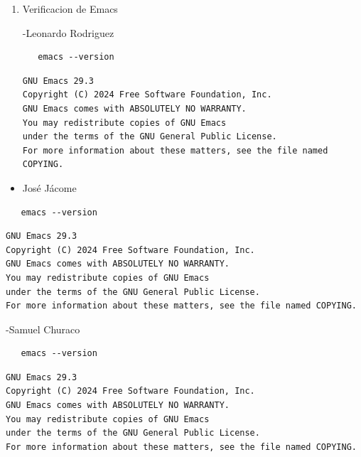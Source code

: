 \documentclass{article}
\begin{document}
\begin{enumerate}
-Samuel Churaco
\begin{verbatim}
   python --version
\end{verbatim}

\begin{verbatim}
Python 3.11.15
\end{verbatim}

\item Verificacion de Emacs

-Leonardo Rodriguez
\begin{verbatim}
   emacs --version
\end{verbatim}

\begin{verbatim}
GNU Emacs 29.3
Copyright (C) 2024 Free Software Foundation, Inc.
GNU Emacs comes with ABSOLUTELY NO WARRANTY.
You may redistribute copies of GNU Emacs
under the terms of the GNU General Public License.
For more information about these matters, see the file named COPYING.
\end{verbatim}
\end{enumerate}


\begin{itemize}
\item José Jácome
\end{itemize}
\begin{verbatim}
   emacs --version
\end{verbatim}

\begin{verbatim}
GNU Emacs 29.3
Copyright (C) 2024 Free Software Foundation, Inc.
GNU Emacs comes with ABSOLUTELY NO WARRANTY.
You may redistribute copies of GNU Emacs
under the terms of the GNU General Public License.
For more information about these matters, see the file named COPYING.
\end{verbatim}


-Samuel Churaco
\begin{verbatim}
   emacs --version
\end{verbatim}

\begin{verbatim}
GNU Emacs 29.3
Copyright (C) 2024 Free Software Foundation, Inc.
GNU Emacs comes with ABSOLUTELY NO WARRANTY.
You may redistribute copies of GNU Emacs
under the terms of the GNU General Public License.
For more information about these matters, see the file named COPYING.
\end{verbatim}
\end{document}
